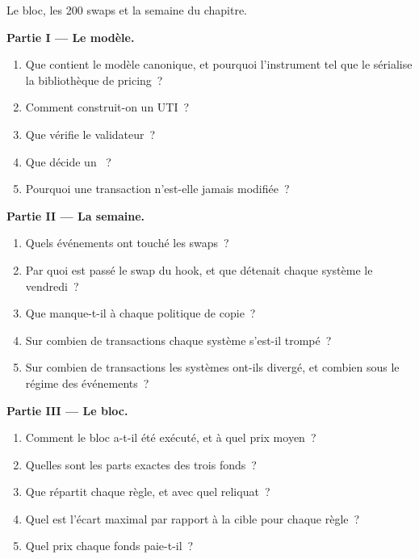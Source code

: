 \begin{problem}\label{pb:pl:trade-capture-and-booking:1}
Le bloc, les 200 swaps et la semaine du chapitre.

\medskip\noindent\textbf{Partie I --- Le modèle.}
\begin{enumerate}
\item Que contient le modèle canonique, et pourquoi l'instrument tel que le sérialise la bibliothèque de pricing~?
\item Comment construit-on un UTI~?
\item Que vérifie le validateur~?
\item Que décide un ~?
\item Pourquoi une transaction n'est-elle jamais modifiée~?
\end{enumerate}

\medskip\noindent\textbf{Partie II --- La semaine.}
\begin{enumerate}[resume]
\item Quels événements ont touché les swaps~?
\item Par quoi est passé le swap du hook, et que détenait chaque système le vendredi~?
\item Que manque-t-il à chaque politique de copie~?
\item Sur combien de transactions chaque système s'est-il trompé~?
\item Sur combien de transactions les systèmes ont-ils divergé, et combien sous le régime des événements~?
\end{enumerate}

\medskip\noindent\textbf{Partie III --- Le bloc.}
\begin{enumerate}[resume]
\item Comment le bloc a-t-il été exécuté, et à quel prix moyen~?
\item Quelles sont les parts exactes des trois fonds~?
\item Que répartit chaque règle, et avec quel reliquat~?
\item Quel est l'écart maximal par rapport à la cible pour chaque règle~?
\item Quel prix chaque fonds paie-t-il~?
\end{enumerate}


\end{problem}
